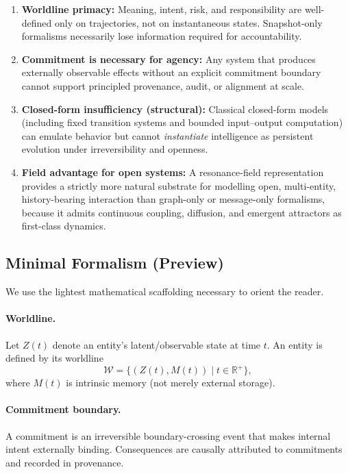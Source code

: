 \documentclass[11pt]{article}
\begin{document}
\begin{enumerate}
  \item \textbf{Worldline primacy:} Meaning, intent, risk, and responsibility are
  well-defined only on trajectories, not on instantaneous states.
  Snapshot-only formalisms necessarily lose information required for accountability.

  \item \textbf{Commitment is necessary for agency:} Any system that produces
  externally observable effects without an explicit commitment boundary cannot
  support principled provenance, audit, or alignment at scale.

  \item \textbf{Closed-form insufficiency (structural):} Classical closed-form models
  (including fixed transition systems and bounded input--output computation) can
  emulate behavior but cannot \emph{instantiate} intelligence as persistent evolution
  under irreversibility and openness.

  \item \textbf{Field advantage for open systems:} A resonance-field representation
  provides a strictly more natural substrate for modelling open, multi-entity,
  history-bearing interaction than graph-only or message-only formalisms, because
  it admits continuous coupling, diffusion, and emergent attractors as first-class
  dynamics.
\end{enumerate}

\vspace{0.5em}
\subsection{Minimal Formalism (Preview)}

We use the lightest mathematical scaffolding necessary to orient the reader.

\paragraph{Worldline.}
Let $Z(t)$ denote an entity's latent/observable state at time $t$. An entity is
defined by its worldline
\[
\mathcal{W} = \{ (Z(t), M(t)) \mid t \in \mathbb{R}^+ \},
\]
where $M(t)$ is intrinsic memory (not merely external storage).

\paragraph{Commitment boundary.}
A commitment is an irreversible boundary-crossing event that makes internal intent
externally binding. Consequences are causally attributed to commitments and recorded
in provenance.
\end{document}
